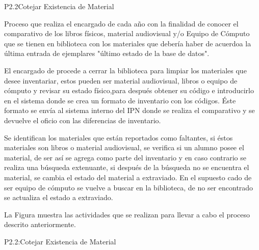 
\begin{Proceso}{P2.2}{Cotejar Existencia de Material} {
  

  Proceso que realiza el  encargado de  cada año con la finalidad de conocer el comparativo de los libros físicos, material audiovisual y/o Equipo de Cómputo que se tienen en biblioteca con los materiales que debería haber de acuerdoa la última entrada de ejemplares "último estado de la base de datos".
  
  El encargado de  procede a cerrar la biblioteca para limpiar los materiales que desee inventariar, estos pueden ser material audiovisual, libros o equipo de cómputo y revisar su estado físico,para después obtener su código e introducirlo en el sistema donde se crea un formato de inventario con los códigos.  Éste formato se envía al sistema interno del IPN donde se realiza el comparativo y se devuelve el oficio con las diferencias de inventario.
  
  Se identifican los materiales que están reportados como faltantes, si éstos materiales son libros o material audiovisual, se verifica si un alumno posee el material, de ser así se agrega como parte del inventario y en caso contrario se realiza una búsqueda extenuante, si después de la búsqueda no se encuentra el material, se cambia el estado del material a extraviado.
En el supuesto cado de ser equipo de cómputo se vuelve a buscar en la biblioteca, de no ser encontrado se actualiza el estado a extraviado.
  
  \noindent La Figura  muestra las actividades que se realizan para llevar a cabo el proceso descrito anteriormente.


} {P2.2:Cotejar Existencia de Material}

   { %
  }


\end{Proceso}
